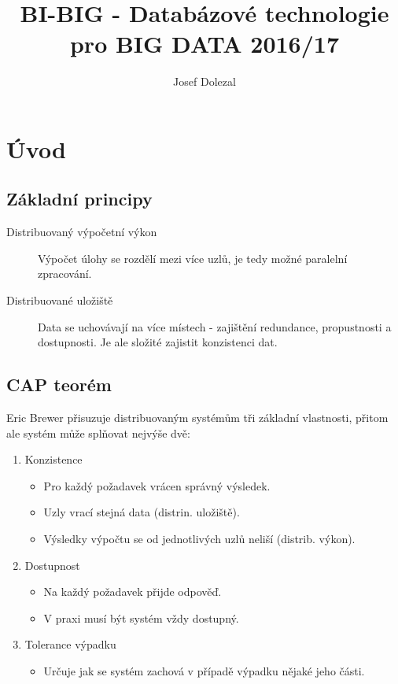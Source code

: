 \documentclass{article}
\title{BI-BIG - Databázové technologie pro BIG DATA 2016/17}
\author{Josef Dolezal}
\begin{document}
\tableofcontents

\newpage

\section{Úvod}
  \subsection{Základní principy}
  \begin{description}
    \item[Distribuovaný výpočetní výkon] Výpočet úlohy se rozdělí mezi více uzlů, je tedy možné paralelní zpracování.
    \item[Distribuované uložiště] Data se uchovávají na více místech - zajištění redundance, propustnosti a dostupnosti.
    Je ale složité zajistit konzistenci dat.
  \end{description}

  \subsection{CAP teorém}
    Eric Brewer přisuzuje distribuovaným systémům tři základní vlastnosti, přitom ale systém může splňovat nejvýše dvě:
    \begin{enumerate}
      \item Konzistence
        \begin{itemize}
          \item Pro každý požadavek vrácen správný výsledek.
          \item Uzly vrací stejná data (distrin. uložiště).
          \item Výsledky výpočtu se od jednotlivých uzlů neliší (distrib. výkon).
        \end{itemize}
      \item Dostupnost
        \begin{itemize}
          \item Na každý požadavek přijde odpověď.
          \item V praxi musí být systém vždy dostupný.
        \end{itemize}
      \item Tolerance výpadku
        \begin{itemize}
          \item Určuje jak se systém zachová v případě výpadku nějaké jeho části.
        \end{itemize}
    \end{enumerate}
\end{document}
